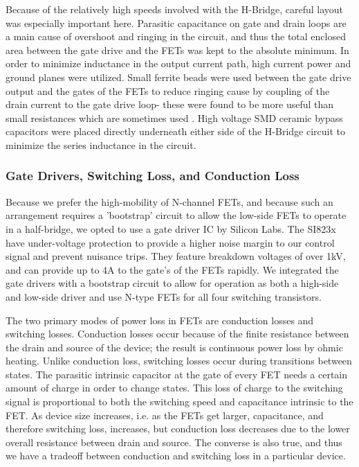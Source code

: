 Because of the relatively high speeds involved with the H-Bridge, careful layout was especially important here. Parasitic capacitance on gate and drain loops are a main cause of overshoot and ringing in the circuit, and thus the total enclosed area between the gate drive and the FETs was kept to the absolute minimum. In order to minimize inductance in the output current path, high current power and ground planes were utilized. Small ferrite beads were used between the gate drive output and the gates of the FETs to reduce ringing cause by coupling of the drain current to the gate drive loop- these were found to be more useful than small resistances which are sometimes used \cite{transphorm}. High voltage SMD ceramic bypass capacitors were placed directly underneath either side of the H-Bridge circuit to minimize the series inductance in the circuit.

\subsubsection{Gate Drivers, Switching Loss, and Conduction Loss}
Because we prefer the high-mobility of N-channel FETs, and because such an arrangement requires a 'bootstrap' circuit to allow the low-side FETs to operate in a half-bridge, we opted to use a gate driver IC by Silicon Labs. 
The SI823x have under-voltage protection to provide a higher noise margin to our control signal and prevent nuisance trips. They feature breakdown voltages of over 1kV, and can provide up to 4A to the gate's of the FETs rapidly. We integrated the gate drivers with a bootstrap circuit to allow for operation as both a high-side and low-side driver and use N-type FETs for all four switching transistors. 

The two primary modes of power loss in FETs are conduction losses and switching losses. Conduction losses occur because of the finite resistance between the drain and source of the device; the result is continuous power loss by ohmic heating. Unlike conduction loss, switching losses occur during transitions between states. The parasitic intrinsic capacitor at the gate of every FET needs a certain amount of charge in order to change states. This loss of charge to the switching signal is proportional to both the switching speed and capacitance intrinsic to the FET. As device size increases, i.e. as the FETs get larger, capacitance, and therefore switching loss, increases, but conduction loss decreases due to the lower overall resistance between drain and source. The converse is also true, and thus we have a tradeoff between conduction and switching loss in a particular device.

